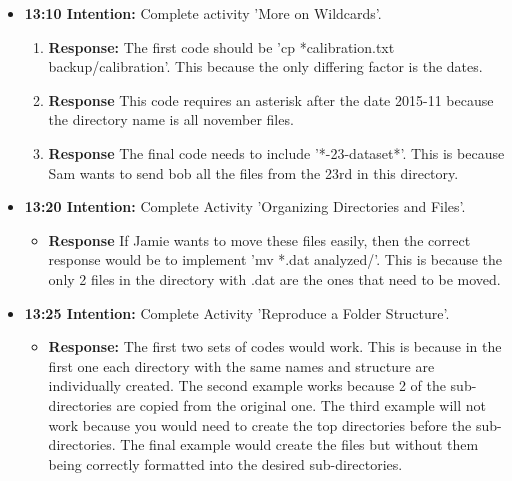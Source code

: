 \documentclass{article}
\begin{document}
\begin{itemize}
\item{\textbf{ 13:10 Intention:} Complete activity 'More on Wildcards'.}
\begin{enumerate}
\item{\textbf{Response:} The first code should be 'cp *calibration.txt backup/calibration'. This because the only differing factor is the dates.}
\item{\textbf{Response} This code requires an asterisk after the date 2015-11 because the directory name is all november files.}
\item{\textbf{Response} The final code needs to include '*-23-dataset*'. This is because Sam wants to send bob all the files from the 23rd in this directory.}
\end{enumerate}

\item{\textbf{13:20 Intention:} Complete Activity 'Organizing Directories and Files'.}

\begin{itemize}
\item{\textbf{Response} If Jamie wants to move these files easily, then the correct response would be to implement 'mv *.dat analyzed/'. This is because the only 2 files in the directory with .dat are the ones that need to be moved.} 
\end{itemize}

\item{\textbf{13:25 Intention:} Complete Activity 'Reproduce a Folder Structure'.}

\begin{itemize}
\item{\textbf{Response:} The first two sets of codes would work. This is because in the first one each directory with the same names and structure are individually created. The second example works because 2 of the sub-directories are copied from the original one. The third example will not work because you would need to create the top directories before the sub-directories. The final example would create the files but without them being correctly formatted into the desired sub-directories.} 
\end{itemize}



\end{itemize}
\end{document}
